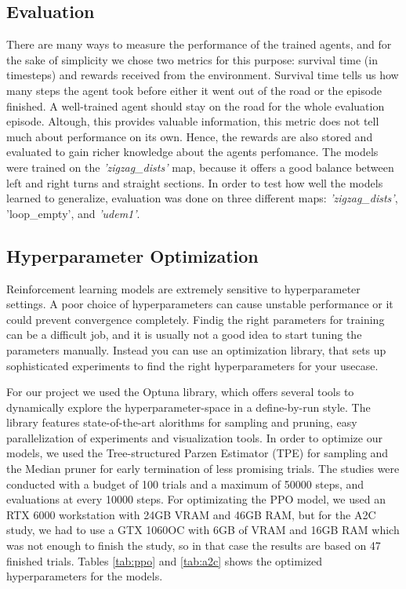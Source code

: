 \documentclass{article}
\begin{document}
\subsection{\normalsize{Evaluation}}
There are many ways to measure the performance of the trained agents, and for the sake of simplicity we chose two metrics for this purpose: survival time (in timesteps) and rewards received from the environment. Survival time tells us how many steps the agent took before either it went out of the road or the episode finished. A well-trained agent should stay on the road for the whole evaluation episode. 
Altough, this provides valuable information, this metric does not tell much about performance on its own. Hence, the rewards are also stored and evaluated to gain richer knowledge about the agents perfomance. The models were trained on the \textit{'zigzag\_dists'} map, because it offers a good balance between left and right turns and straight sections. In order to test how well the models learned to generalize, evaluation was done on three different maps: \textit{'zigzag\_dists'}, 'loop\_empty', and \textit{'udem1'}.

\subsection{\normalsize{Hyperparameter Optimization}}
Reinforcement learning models are extremely sensitive to hyperparameter settings. A poor choice of hyperparameters can cause unstable performance or it could prevent convergence completely. Findig the right parameters for training can be a difficult job, and it is usually not a good idea to start tuning the parameters manually. Instead you can use an optimization library, that sets up sophisticated experiments to find the right hyperparameters for your usecase.

For our project we used the Optuna library, which offers several tools to dynamically explore the hyperparameter-space in a define-by-run style. The library features state-of-the-art alorithms for sampling and pruning, easy parallelization of experiments and visualization tools. In order to optimize our models, we used the Tree-structured Parzen Estimator (TPE) for sampling and the Median pruner for early termination of less promising trials. 
The studies were conducted with a budget of 100 trials and a maximum of 50000 steps, and evaluations at every 10000 steps. For optimizating the PPO model, we used an RTX 6000 workstation with 24GB VRAM and 46GB RAM, but for the A2C study, we had to use a GTX 1060OC with 6GB of VRAM and 16GB RAM which was not enough to finish the study, so in that case the results are based on 47 finished trials. Tables \ref{tab:ppo} and \ref{tab:a2c} shows the optimized hyperparameters for the models.
\end{document}
